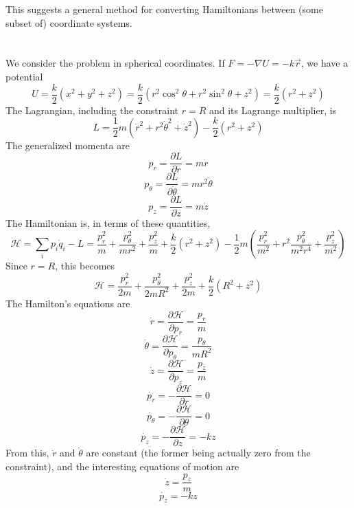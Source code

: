 \documentclass{article}
\begin{document}
This suggests a general method for converting Hamiltonians between (some subset of) coordinate systems.

\section{}
We consider the problem in spherical coordinates. If $F=-\nabla U=-k\vec{r}$, we have a potential \[U=\frac{k}{2}\left(x^2+y^2+z^2\right)=\frac{k}{2}\left(r^2\cos^2\theta+r^2\sin^2\theta+z^2\right)=\frac{k}{2}\left( r^2+z^2 \right)\]
The Lagrangian, including the constraint $r=R$ and its Lagrange multiplier, is
\[L=\frac{1}{2}m(\dot{r}^2+r^2\dot{\theta}^2+\dot{z}^2)-\frac{k}{2}\left( r^2+z^2 \right)\]
The generalized momenta are
\[p_r=\frac{\partial L}{\partial \dot{r}}=m\dot{r}\]
\[p_\theta=\frac{\partial L}{\partial\dot{\theta}}=mr^2\dot{\theta}\]
\[p_z=\frac{\partial L}{\partial\dot{z}}=m\dot{z}\]
The Hamiltonian is, in terms of these quantities,
\[\mathcal{H}=\sum_ip_i\dot{q}_i-L=\frac{p_r^2}{m}+\frac{p_\theta^2}{mr^2}+\frac{p_z^2}{m}+\frac{k}{2}\left( r^2+z^2 \right)-\frac{1}{2}m\left( \frac{p_r^2}{m^2}+r^2\frac{p_\theta^2}{m^2r^4}+\frac{p_z^2}{m^2} \right)\]
Since $r=R$, this becomes
\[\mathcal{H}=\frac{p_r^2}{2m}+\frac{p_\theta^2}{2mR^2}+\frac{p_z^2}{2m}+\frac{k}{2}\left( R^2+z^2 \right)\]
The Hamilton's equations are
\[\dot{r}=\frac{\partial \mathcal{H}}{\partial {p_r}}=\frac{p_r}{m}\]
\[\dot{\theta}=\frac{\partial\mathcal{H}}{\partial{p_\theta}}=\frac{p_\theta}{mR^2}\]
\[\dot{z}=\frac{\partial\mathcal{H}}{\partial{p_z}}=\frac{p_z}{m}\]
\[\dot{p_r}=-\frac{\partial\mathcal{H}}{\partial r}=0\]
\[\dot{p_\theta}=-\frac{\partial\mathcal{H}}{\partial \theta}=0\]
\[\dot{p_z}=-\frac{\partial\mathcal{H}}{\partial z}=-kz\]
From this, $\dot{r}$ and $\dot{\theta}$ are constant (the former being actually zero from the constraint), and the interesting equations of motion are
\[\dot{z}=\frac{p_z}{m}\]
\[\dot{p_z}=-kz\]
\end{document}
